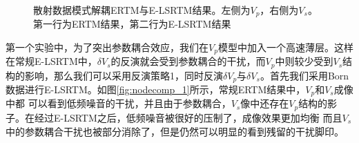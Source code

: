 \begin{figure}
   \centering
   \\
   \caption{散射数据模式解耦ERTM与E-LSRTM结果。左侧为$V_p$，右侧为$V_s$。第一行为ERTM结果，第二行为E-LSRTM结果}
   \label{fig:LSRTM_1_refl}
\end{figure}

第一个实验中，为了突出参数耦合效应，我们在$V_p$模型中加入一个高速薄层。这样在常规E-LSRTM中，$\delta
V_s$的反演就会受到参数耦合的干扰，而$V_p$中则较少受到$V_s$结构的影响，那么我们可以采用反演策略1，同时反演$\delta
V_p$与$\delta V_s$。首先我们采用Born数据进行E-LSRTM。如图\ref{fig:nodecomp_1}所示，常规ERTM结果中，$V_p$和$V_s$成像中都
可以看到低频噪音的干扰，并且由于参数耦合，$V_s$像中还存在$V_p$结构的影子。在经过E-LSRTM之后，低频噪音被很好的压制了，成像效果更加均衡
而且$V_s$中的参数耦合干扰也被部分消除了，但是仍然可以明显的看到残留的干扰脚印。


